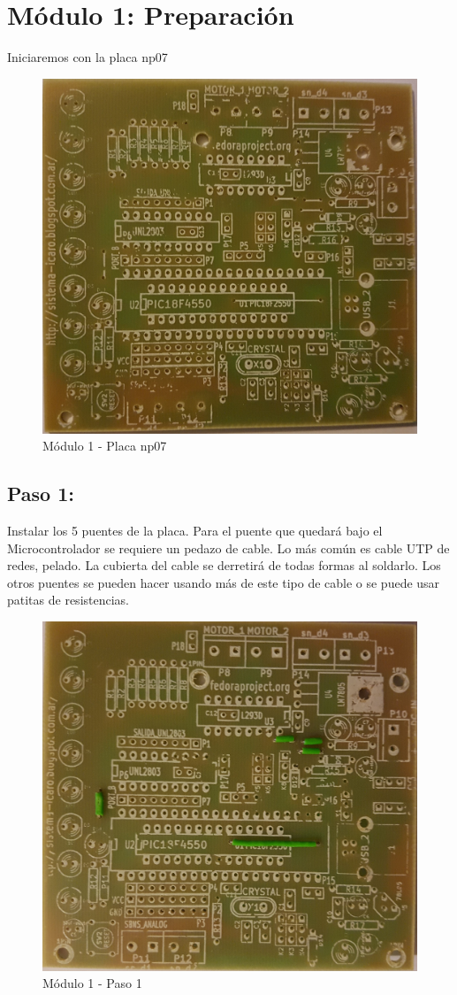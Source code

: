 \chapter{Módulo 1: Preparación}

Iniciaremos con la placa np07

\begin{figure}[h]
	\centering
	\includegraphics[width=0.8\linewidth]{Modulo_1/M1_0}
	\caption{Módulo 1 - Placa np07}
	\label{fig:M1_0}
\end{figure}

\newpage

\section{Paso 1:}

Instalar los 5 puentes de la placa. Para el puente que quedará bajo el Microcontrolador se requiere un pedazo de cable. Lo más común es cable UTP de redes, pelado. La cubierta del cable se derretirá de todas formas al soldarlo. Los otros puentes se pueden hacer usando más de este tipo de cable o se puede usar patitas de resistencias.

\begin{figure}[h]
	\centering
	\includegraphics[width=0.8\linewidth]{Modulo_1/M1_1}
	\caption{Módulo 1 - Paso 1}
	\label{fig:M1_1}
\end{figure}


